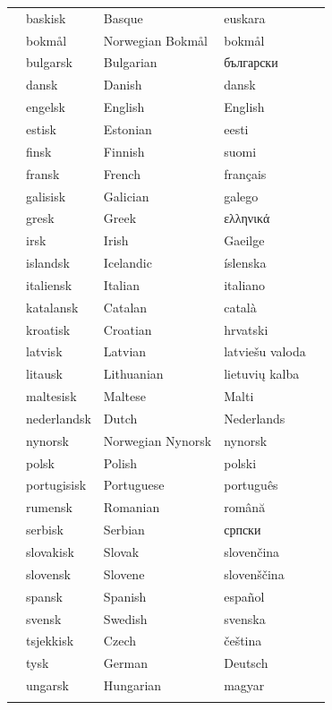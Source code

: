 \vspace*{-5mm}
\centering
  \setlength{\tabcolsep}{2.6em}
  \begin{tabularx}{\textwidth}{lllll} \toprule\addlinespace
  &baskisk & Basque & euskara& \\
  &bokmål & Norwegian Bokmål & bokmål& \\
  &bulgarsk & Bulgarian & български& \\
  &dansk & Danish & dansk& \\
  &engelsk & English & English& \\
  &estisk & Estonian & eesti& \\
  &finsk & Finnish & suomi& \\
  &fransk & French & français& \\
  &galisisk & Galician & galego& \\
  &gresk & Greek & ελληνικά& \\
  &irsk & Irish & Gaeilge& \\
  &islandsk & Icelandic & íslenska& \\
  &italiensk & Italian & italiano& \\
  &katalansk & Catalan & català& \\
  &kroatisk & Croatian & hrvatski& \\
  &latvisk & Latvian & latviešu valoda& \\
  &litausk & Lithuanian & lietuvių kalba& \\
  &maltesisk & Maltese & Malti& \\
  &nederlandsk & Dutch & Nederlands& \\
  &nynorsk & Norwegian Nynorsk & nynorsk& \\
  &polsk & Polish & polski& \\
  &portugisisk & Portuguese & português& \\
  &rumensk & Romanian & română& \\
  &serbisk & Serbian & српски& \\
  &slovakisk & Slovak & slovenčina& \\
  &slovensk & Slovene & slovenščina& \\
  &spansk & Spanish & español& \\
  &svensk & Swedish & svenska& \\
  &tsjekkisk & Czech & čeština& \\
  &tysk & German & Deutsch& \\
  &ungarsk & Hungarian & magyar& \\ \addlinespace \bottomrule
\end{tabularx}

